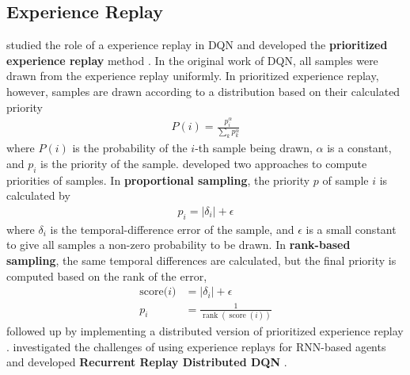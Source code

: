\subsection{Experience Replay}
\citeauthor{PrioritizedExperienceReplay_Schaul.Quan.ea_2016} studied the role of a experience replay in DQN and developed the \textbf{prioritized experience replay} method \cite{PrioritizedExperienceReplay_Schaul.Quan.ea_2016}.
In the original work of DQN, all samples were drawn from the experience replay uniformly.
In prioritized experience replay, however, samples are drawn according to a distribution based on their calculated priority
\begin{align*}
    P(i)=\frac{p_{i}^{\alpha}}{\sum_{k} p_{k}^{\alpha}}
\end{align*}
where $P(i)$ is the probability of the $i$-th sample being drawn, $\alpha$ is a constant, and $p_i$ is the priority of the sample.
\citeauthor{PrioritizedExperienceReplay_Schaul.Quan.ea_2016} developed two approaches to compute priorities of samples.
In \textbf{proportional sampling}, the priority $p$ of sample $i$ is calculated by
\begin{align*}
    p_i = \left|\delta_{i}\right|+\epsilon
\end{align*}
where $\delta_{i}$ is the temporal-difference error of the sample, and $\epsilon$ is a small constant to give all samples a non-zero probability to be drawn.
In \textbf{rank-based sampling}, the same temporal differences are calculated, but the final priority is computed based on the rank of the error,
\begin{align*}
    \text{score($i$)}  & = \left|\delta_{i}\right|+\epsilon  \\
    p_{i}              & = \frac{1}{\operatorname{rank}(\operatorname{score}(i))}
\end{align*}
\citeauthor{DistributedPrioritizedExperience_Horgan.Quan.ea_2022} followed up by implementing a distributed version of prioritized experience replay \cite{DistributedPrioritizedExperience_Horgan.Quan.ea_2022}.
\citeauthor{RecurrentExperienceReplay_Kapturowski.Ostrovski.ea_2022} investigated the challenges of using experience replays for RNN-based agents and developed \textbf{Recurrent Replay Distributed DQN} \cite{RecurrentExperienceReplay_Kapturowski.Ostrovski.ea_2022}.

